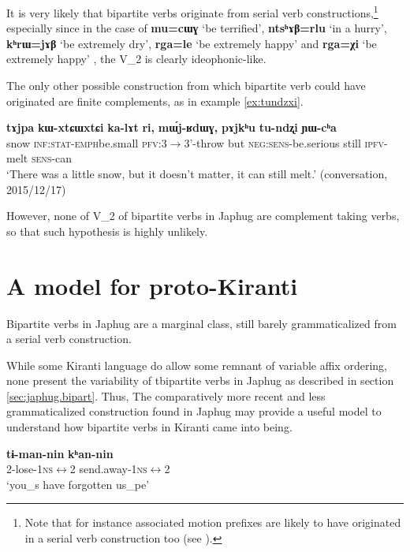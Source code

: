 \documentclass[oldfontcommands,oneside,a4paper,11pt]{article}
\newcommand{\ipa}[1]{{\phon\textbf{#1}}}
\newcommand{\jpg}[2]{\ipa{#1} `#2'}
\begin{document}
It is very likely that bipartite verbs originate from serial verb constructions,\footnote{Note that for instance associated motion prefixes are likely to have originated in a serial verb construction too (see \citealt{jacques13harmonization}).} especially since in the case of \jpg{mu=cɯɣ}{be  terrified}, \jpg{ntsʰɤβ=rlu}{in a hurry}, \jpg{kʰrɯ=jɤβ}{be extremely dry}, \jpg{rga=le}{be extremely happy} and \jpg{rga=χi}{be extremely happy} , the V_2 is clearly ideophonic-like. 

The only other possible construction from which bipartite verb could have originated are finite complements, as in example \ref{ex:tundzxi}.

\begin{exe}
\ex \label{ex:tundzxi}
\gll 
\ipa{tɤjpa} 	\ipa{kɯ-xtɕɯ\tld{}xtɕi} 	\ipa{ka-lɤt} 	\ipa{ri,} 	\ipa{mɯ́j-ʁdɯɣ,} 	\ipa{pɤjkʰu} 	\ipa{tu-ndʐi} 	\ipa{ɲɯ-cʰa} \\
snow \textsc{inf:stat-emph}\tld{}be.small \textsc{pfv}:3$\rightarrow$3'-throw but \textsc{neg:sens}-be.serious still \textsc{ipfv}-melt \textsc{sens}-can \\
\glt `There was a little snow, but it doesn't matter, it can still melt.' (conversation, 2015/12/17)
\end{exe}

However, none of V_2 of bipartite verbs in Japhug are complement taking verbs, so that such hypothesis is highly unlikely. 

\section{A model for proto-Kiranti}
Bipartite verbs in Japhug are a marginal class, still barely grammaticalized from a serial verb construction.  

While some Kiranti language do allow some remnant of variable affix ordering, none present the variability of tbipartite verbs in Japhug as described in section \ref{sec:japhug.bipart}. Thus, The comparatively more recent and less grammaticalized construction found in Japhug may provide a useful model to understand how bipartite verbs in Kiranti came into being.

\citealt[168]{doornenbal09} 
\begin{exe}
\ex
\gll
\ipa{tɨ-man-nin} \ipa{kʰan-nin} \\
2-lose-\textsc{1ns$\leftrightarrow$2} send.away-\textsc{1ns$\leftrightarrow$2} \\
\glt ‘you_s have forgotten us_{pe}’
\end{exe}
\end{document}
